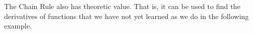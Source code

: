 
The Chain Rule also has theoretic value. That is, it can be used to find the derivatives of functions that we have not yet learned as we do in the following example.\\

